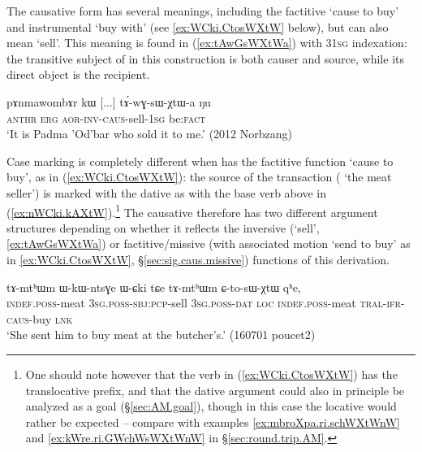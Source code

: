 The causative form  has several meanings, including the factitive `cause to buy' and instrumental  `buy with' (see \ref{ex:WCki.CtosWXtW} below), but can also mean `sell'. This meaning is found in (\ref{ex:tAwGsWXtWa}) with 3\fl{}\textsc{1sg} indexation: the transitive subject of  in this construction is both causer and source, while its direct object is the recipient.

\begin{exe}
\ex \label{ex:tAwGsWXtWa}
\gll  pɤnmawombɤr kɯ [...] tɤ́-wɣ-sɯ-χtɯ-a ŋu \\
\textsc{anthr} \textsc{erg} { } \textsc{aor}-\textsc{inv}-\textsc{caus}-sell-\textsc{1sg} be:\textsc{fact} \\
\glt `It is Padma 'Od'bar who sold it to me.' (2012 Norbzang)
\end{exe} 

Case marking is completely different when  has the factitive function `cause to buy', as in (\ref{ex:WCki.CtosWXtW}): the source of the transaction ( `the meat seller') is marked with the dative as with the base verb above in (\ref{ex:nWCki.kAXtW}).\footnote{One should note however that the verb in (\ref{ex:WCki.CtosWXtW}) has the translocative prefix, and that the dative argument could also in principle be analyzed as a goal (§\ref{sec:AM.goal}), though in this case the locative  would rather be expected -- compare with examples \ref{ex:mbroXpa.ri.schWXtWnW}  and \ref{ex:kWre.ri.GWchWsWXtWnW} in §\ref{sec:round.trip.AM}.} The causative   therefore has two different argument structures depending on whether it reflects the inversive (`sell', \ref{ex:tAwGsWXtWa}) or factitive/missive (with associated motion `send to buy' as in \ref{ex:WCki.CtosWXtW}, §\ref{sec:sig.caus.missive}) functions of this derivation.

\begin{exe}
\ex \label{ex:WCki.CtosWXtW}
\gll tɤ-mtʰɯm ɯ-kɯ-ntsɣe ɯ-ɕki tɕe tɤ-mtʰɯm ɕ-to-sɯ-χtɯ qʰe, \\
\textsc{indef}.\textsc{poss}-meat \textsc{3sg}.\textsc{poss}-\textsc{sbj}:\textsc{pcp}-sell \textsc{3sg}.\textsc{poss}-\textsc{dat} \textsc{loc} \textsc{indef}.\textsc{poss}-meat \textsc{tral}-\textsc{ifr}-\textsc{caus}-buy \textsc{lnk} \\
\glt `She sent him to buy meat at the butcher's.' (160701 poucet2)
\end{exe}

